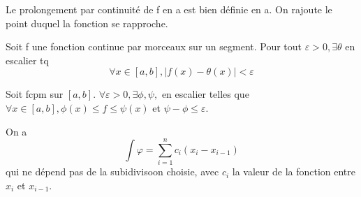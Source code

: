 \documentclass[french]{yLectureNote}
\begin{document}
Le prolongement par continuité de f en a est bien définie en a. On rajoute le point duquel la fonction se rapproche.
\begin{theorem}
Soit f une fonction continue par morceaux sur un segment. Pour tout \(\varepsilon >0, \exists \theta\) en escalier tq \[\forall x\in [a,b], |f(x)-\theta(x)|<\varepsilon\]
\end{theorem}
%
%
%
%
%
%
%
%
%
\begin{proposition}
Soit fcpm sur $[a,b]$. $\forall \varepsilon >0,\exists \phi,\psi, $ en escalier telles que $\forall x\in[a,b], \phi(x)\leq f\leq \psi(x)$ et $\psi-\phi \leq \varepsilon$.
\end{proposition}
\begin{proposition}
On a \[\int \varphi = \sum^{n}_{i=1} c_i(x_i-x_{i-1})\] qui ne dépend pas de la subidivisoon choisie, avec $c_i$ la valeur de la fonction entre $x_i$ et $x_{i-1}$.
\end{proposition}
\end{document}
